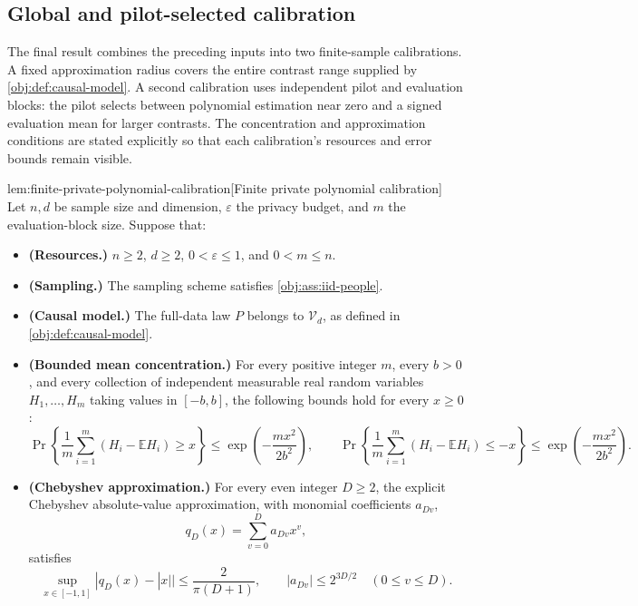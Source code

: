 \documentclass[11pt]{article}
\begin{document}
\subsection{Global and pilot-selected calibration}

The final result combines the preceding inputs into two finite-sample calibrations. A fixed approximation radius covers the entire contrast range supplied by \cref{obj:def:causal-model}. A second calibration uses independent pilot and evaluation blocks: the pilot selects between polynomial estimation near zero and a signed evaluation mean for larger contrasts. The concentration and approximation conditions are stated explicitly so that each calibration's resources and error bounds remain visible.

\begin{lemmav}{lem:finite-private-polynomial-calibration}[Finite private polynomial calibration]
Let \(n,d\) be sample size and dimension, \(\varepsilon\) the privacy budget, and \(m\) the evaluation-block size. Suppose that:
\begin{itemize}
\item \textbf{(Resources.)} \(n\ge2\), \(d\ge2\), \(0<\varepsilon\le1\), and \(0<m\le n\).
\item \textbf{(Sampling.)} The sampling scheme satisfies \cref{obj:ass:iid-people}.
\item \textbf{(Causal model.)} The full-data law \(P\) belongs to \(\mathcal V_d\), as defined in \cref{obj:def:causal-model}.
\item \textbf{(Bounded mean concentration.)} For every positive integer \(m\), every \(b>0\), and every collection of independent measurable real random variables \(H_1,\ldots,H_m\) taking values in \([-b,b]\), the following bounds hold for every \(x\ge0\):
\[
 \Pr\!\left\{\frac1m\sum_{i=1}^m(H_i-\mathbb EH_i)\ge x\right\}
 \le \exp\!\left(-\frac{mx^2}{2b^2}\right),
 \qquad
 \Pr\!\left\{\frac1m\sum_{i=1}^m(H_i-\mathbb EH_i)\le -x\right\}
 \le \exp\!\left(-\frac{mx^2}{2b^2}\right).
\]
\item \textbf{(Chebyshev approximation.)} For every even integer \(D\ge2\), the explicit Chebyshev absolute-value approximation, with monomial coefficients \(a_{Dv}\),
\[
 q_D(x)=\sum_{v=0}^D a_{Dv}x^v,
\]
satisfies
\[
 \sup_{x\in[-1,1]}|q_D(x)-|x||\le\frac{2}{\pi(D+1)},
 \qquad
 |a_{Dv}|\le 2^{3D/2}\quad(0\le v\le D).
\]
\end{itemize}


\end{lemmav}
\end{document}
